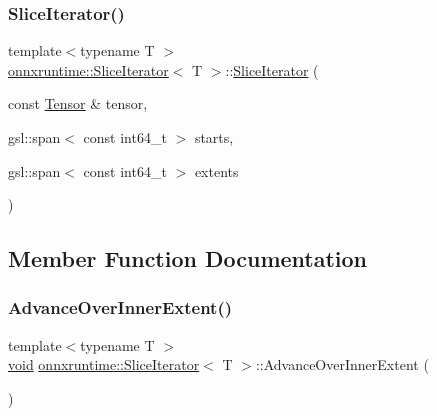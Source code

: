 \subsubsection{\texorpdfstring{Slice\+Iterator()}{SliceIterator()}}
{\footnotesize\ttfamily template$<$typename T $>$ \\
\mbox{\hyperlink{structonnxruntime_1_1SliceIterator}{onnxruntime\+::\+Slice\+Iterator}}$<$ T $>$\+::\mbox{\hyperlink{structonnxruntime_1_1SliceIterator}{Slice\+Iterator}} (\begin{DoxyParamCaption}\item[{const \mbox{\hyperlink{classonnxruntime_1_1Tensor}{Tensor}} \&}]{tensor,  }\item[{gsl\+::span$<$ const int64\+\_\+t $>$}]{starts,  }\item[{gsl\+::span$<$ const int64\+\_\+t $>$}]{extents }\end{DoxyParamCaption})\hspace{0.3cm}{\ttfamily [inline]}}



\subsection{Member Function Documentation}
\mbox{\label{structonnxruntime_1_1SliceIterator_af23a82ce0ef66164c5b40f82d650ef0f}} 
\subsubsection{\texorpdfstring{Advance\+Over\+Inner\+Extent()}{AdvanceOverInnerExtent()}}
{\footnotesize\ttfamily template$<$typename T $>$ \\
\mbox{\hyperlink{mlasi_8h_a88f941d423cb2a819b70a1358982b1a6}{void}} \mbox{\hyperlink{structonnxruntime_1_1SliceIterator}{onnxruntime\+::\+Slice\+Iterator}}$<$ T $>$\+::Advance\+Over\+Inner\+Extent (\begin{DoxyParamCaption}{ }\end{DoxyParamCaption})\hspace{0.3cm}{\ttfamily [inline]}}

\mbox{\label{structonnxruntime_1_1SliceIterator_a5f7af2187fb7a2e5431bb0b542b0e187}} 
